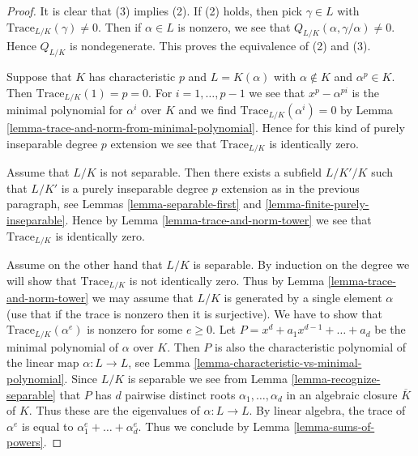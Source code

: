 \begin{proof}
It is clear that (3) implies (2). If (2) holds, then pick $\gamma \in L$
with $\text{Trace}_{L/K}(\gamma) \not = 0$. Then if $\alpha \in L$
is nonzero, we see that $Q_{L/K}(\alpha, \gamma/\alpha) \not = 0$.
Hence $Q_{L/K}$ is nondegenerate. This proves the equivalence of
(2) and (3).

\medskip\noindent
Suppose that $K$ has characteristic $p$ and $L = K(\alpha)$ with
$\alpha \not \in K$ and $\alpha^p \in K$. Then $\text{Trace}_{L/K}(1) = p = 0$.
For $i = 1, \ldots, p - 1$ we see that $x^p - \alpha^{pi}$ is the minimal
polynomial for $\alpha^i$ over $K$ and we find
$\text{Trace}_{L/K}(\alpha^i) = 0$ by
Lemma \ref{lemma-trace-and-norm-from-minimal-polynomial}.
Hence for this kind of purely inseparable degree $p$ extension
we see that $\text{Trace}_{L/K}$ is identically zero.

\medskip\noindent
Assume that $L/K$ is not separable. Then there exists a subfield
$L/K'/K$ such that $L/K'$ is a purely inseparable degree $p$ extension
as in the previous paragraph, see
Lemmas \ref{lemma-separable-first} and \ref{lemma-finite-purely-inseparable}.
Hence by Lemma \ref{lemma-trace-and-norm-tower}
we see that $\text{Trace}_{L/K}$ is identically zero.

\medskip\noindent
Assume on the other hand that $L/K$ is separable.
By induction on the degree we will show that
$\text{Trace}_{L/K}$ is not identically zero.
Thus by Lemma \ref{lemma-trace-and-norm-tower} we may assume that
$L/K$ is generated by a single element $\alpha$ (use that if
the trace is nonzero then it is surjective).
We have to show that $\text{Trace}_{L/K}(\alpha^e)$
is nonzero for some $e \geq 0$.
Let $P = x^d + a_1 x^{d - 1} + \ldots + a_d$ be the minimal
polynomial of $\alpha$ over $K$.
Then $P$ is also the characteristic polynomial of the linear
map $\alpha : L \to L$, see
Lemma \ref{lemma-characteristic-vs-minimal-polynomial}.
Since $L/K$ is separable we see from Lemma \ref{lemma-recognize-separable}
that $P$ has $d$ pairwise distinct roots $\alpha_1, \ldots, \alpha_d$
in an algebraic closure $\overline{K}$ of $K$. Thus these are the
eigenvalues of $\alpha : L \to L$.
By linear algebra, the trace of $\alpha^e$ is
equal to $\alpha_1^e + \ldots + \alpha_d^e$.
Thus we conclude by Lemma \ref{lemma-sums-of-powers}.
\end{proof}

